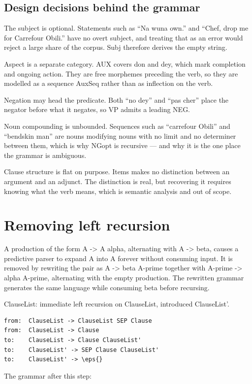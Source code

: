 \documentclass[11pt,a4paper]{article}
\newcommand{\vbfmt}{\color{ink!88}}
\newcommand{\eps}{\ensuremath{\varepsilon}}
\begin{document}
\subsection{Design decisions behind the grammar}
The subject is optional. Statements such as ``Na wuna own.'' and ``Chef, drop me for Carrefour Obili.'' have no overt subject, and treating that as an error would reject a large share of the corpus. Subj therefore derives the empty string.

Aspect is a separate category. AUX covers don and dey, which mark completion and ongoing action. They are free morphemes preceding the verb, so they are modelled as a sequence AuxSeq rather than as inflection on the verb.

Negation may head the predicate. Both ``no dey'' and ``pas cher'' place the negator before what it negates, so VP admits a leading NEG.

Noun compounding is unbounded. Sequences such as ``carrefour Obili'' and ``bendskin man'' are nouns modifying nouns with no limit and no determiner between them, which is why NGopt is recursive --- and why it is the one place the grammar is ambiguous.

Clause structure is flat on purpose. Items makes no distinction between an argument and an adjunct. The distinction is real, but recovering it requires knowing what the verb means, which is semantic analysis and out of scope.

\section{Removing left recursion}
\label{sec:removing-left-recursion}
A production of the form A -> A alpha, alternating with A -> beta, causes a predictive parser to expand A into A forever without consuming input. It is removed by rewriting the pair as A -> beta A-prime together with A-prime -> alpha A-prime, alternating with the empty production. The rewritten grammar generates the same language while consuming beta before recursing.

ClauseList: immediate left recursion on ClauseList, introduced ClauseList'.

\begin{Verbatim}[commandchars=\\\{\},fontsize=\small,formatcom=\vbfmt,frame=leftline,framerule=1.2pt,rulecolor=\color{clay!55},framesep=6pt,xleftmargin=10pt,xrightmargin=4pt]
from:  ClauseList -> ClauseList SEP Clause
from:  ClauseList -> Clause
to:    ClauseList -> Clause ClauseList'
to:    ClauseList' -> SEP Clause ClauseList'
to:    ClauseList' -> \eps{}
\end{Verbatim}
The grammar after this step:
\end{document}
